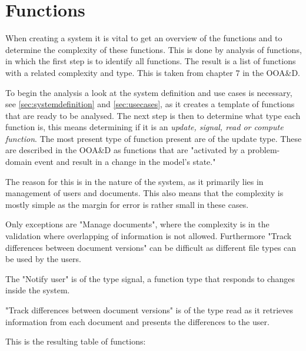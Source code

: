 \section{Functions}
When creating a system it is vital to get an overview of the functions and to determine the complexity of these functions.
This is done by analysis of functions, in which the first step is to identify all functions.
The result is a list of functions with a related complexity and type.
This is taken from chapter $7$ in the OOA\&D.\citep[ch.~7]{Rod-Aalborg}

To begin the analysis a look at the system definition and use cases is necessary, see \cref{sec:systemdefinition} and \cref{sec:usecases}, as it creates a template of functions that are ready to be analysed.
The next step is then to determine what type each function is, this means determining if it is an \textit{update, signal, read or compute function}.
The most present type of function present are of the update type.
These are described in the OOA\&D as functions that are "activated by a problem-domain event and result in a change in the model's state."\citep[p.~140]{Rod-Aalborg}

The reason for this is in the nature of the system, as it primarily lies in management of users and documents.
This also means that the complexity is mostly simple as the margin for error is rather small in these cases. 

Only exceptions are "Manage documents", where the complexity is in the validation where overlapping of information is not allowed.
Furthermore "Track differences between document versions" can be difficult as different file types can be used by the users.

The "Notify user" is of the type signal, a function type that responds to changes inside the system.

"Track differences between document versions" is of the type read as it retrieves information from each document and presents the differences to the user.

This is the resulting table of functions:

